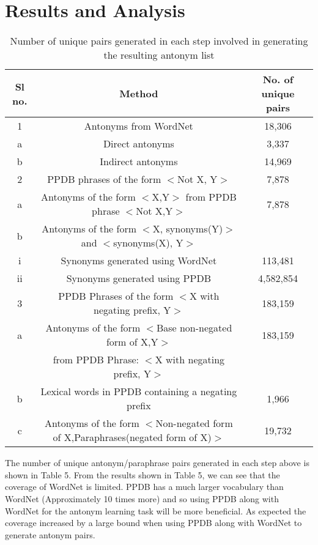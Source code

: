 \documentclass[11pt]{article}
\begin{document}
\section{ Results and Analysis}
\begin{table*}[h!]
 \begin{tabular}{|c | c | c|} 
 \hline
 Sl no. & Method & No. of unique pairs \\ [0.5ex]
 \hline\hline
 1 & Antonyms from WordNet & 18,306\\
 a & Direct antonyms & 3,337\\
 b & Indirect antonyms & 14,969\\
 \hline
 2 & PPDB phrases of the form $<$Not X, Y$>$ & 7,878\\
 a & Antonyms of the form $<$X,Y$>$ from PPDB phrase $<$Not X,Y$>$ & 7,878\\
 b & Antonyms of the form $<$X, synonyms(Y)$>$ and $<$synonyms(X), Y$>$ &  \\
  i &  Synonyms generated using WordNet & 113,481\\
  ii & Synonyms generated using PPDB & 4,582,854\\
 \hline
 3 & PPDB Phrases of the form $<$X with negating prefix, Y$>$ & 183,159\\
 a & Antonyms of the form $<$Base non-negated form of X,Y$>$ & 183,159\\
  & from PPDB Phrase: $<$X with negating prefix, Y$>$ & \\
 b & Lexical words in PPDB containing a negating prefix
 & 1,966\\ 
 c & Antonyms of the form $<$Non-negated form of X,Paraphrases(negated form of X)$>$ & 19,732\\
 \hline
\end{tabular}
\caption{Number of unique pairs generated in each step involved in generating the resulting antonym list}
\end{table*}
The number of unique antonym/paraphrase pairs generated in each step above is shown in Table 5.
From the results shown in Table 5, we can see that the coverage of WordNet is limited. PPDB has a much larger vocabulary than WordNet (Approximately 10 times more) and so using PPDB along with WordNet for the antonym learning task will be more beneficial. As expected the coverage increased by a large bound when using PPDB along with WordNet to generate antonym pairs. 
\end{document}
